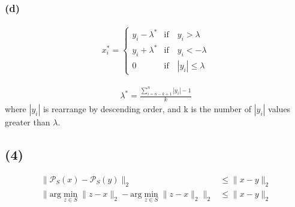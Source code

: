 \documentclass[12pt]{article}
\begin{document}
\subsubsection{(d)}

\begin{align*}
    x_i^* = \begin{cases}
        y_i - \lambda^* &\text{if}\quad y_i > \lambda \\
        y_i + \lambda^* &\text{if}\quad y_i < -\lambda \\
        0             &\text{if}\quad |y_i| \leq \lambda
    \end{cases}
\end{align*}

\begin{align*}
    \lambda^* = \frac{\sum_{i=n-k+1}^{n}|y_{i}| - 1}{k}
\end{align*}
where \(|y_i|\) is rearrange by descending order, and k is the number of \(|y_i|\) values greater than \(\lambda\).


\subsection{(4)}
\begin{align*}
    \|\mathcal{P}_S(x) - \mathcal{P}_S(y) \|_2 &\leq \|x - y\|_2 \\
    \|\text{arg} \min_{z \in S} \|z - x\|_2 - \text{arg} \min_{z \in S} \|z - x\|_2 \|_2 &\leq \|x - y\|_2
\end{align*}
\end{document}
